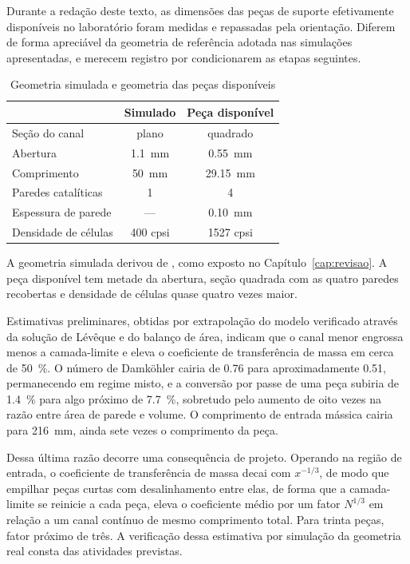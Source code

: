 Durante a redação deste texto, as dimensões das peças de suporte efetivamente
disponíveis no laboratório foram medidas e repassadas pela orientação. Diferem
de forma apreciável da geometria de referência adotada nas simulações
apresentadas, e merecem registro por condicionarem as etapas seguintes.

\begin{table}[htb]
\centering
\caption{Geometria simulada e geometria das peças disponíveis}
\label{tab:geomreal}
\begin{tabular}{l c c}
\toprule
 & Simulado & Peça disponível \\
\midrule
Seção do canal          & plano          & quadrado \\
Abertura                & \SI{1.1}{\milli\meter} & \SI{0.55}{\milli\meter} \\
Comprimento             & \SI{50}{\milli\meter}  & \SI{29.15}{\milli\meter} \\
Paredes catalíticas     & \num{1}        & \num{4} \\
Espessura de parede     & ---            & \SI{0.10}{\milli\meter} \\
Densidade de células    & \num{400} cpsi & \num{1527} cpsi \\
\bottomrule
\end{tabular}
\end{table}

A geometria simulada derivou de \textcite{Asli2011}, como exposto no
Capítulo~\ref{cap:revisao}. A peça disponível tem metade da abertura, seção
quadrada com as quatro paredes recobertas e densidade de células quase quatro
vezes maior.

Estimativas preliminares, obtidas por extrapolação do modelo verificado através
da solução de Lévêque e do balanço de área, indicam que o canal menor engrossa
menos a camada-limite e eleva o coeficiente de transferência de massa em cerca
de \SI{50}{\percent}. O número de Damköhler cairia de \num{0.76} para
aproximadamente \num{0.51}, permanecendo em regime misto, e a conversão por
passe de uma peça subiria de \SI{1.4}{\percent} para algo próximo de
\SI{7.7}{\percent}, sobretudo pelo aumento de oito vezes na razão entre área de
parede e volume. O comprimento de entrada mássica cairia para
\SI{216}{\milli\meter}, ainda sete vezes o comprimento da peça.

Dessa última razão decorre uma consequência de projeto. Operando na região de
entrada, o coeficiente de transferência de massa decai com $x^{-1/3}$, de modo
que empilhar peças curtas com desalinhamento entre elas, de forma que a
camada-limite se reinicie a cada peça, eleva o coeficiente médio por um fator
$N^{1/3}$ em relação a um canal contínuo de mesmo comprimento total. Para trinta
peças, fator próximo de três. A verificação dessa estimativa por simulação da
geometria real consta das atividades previstas.

